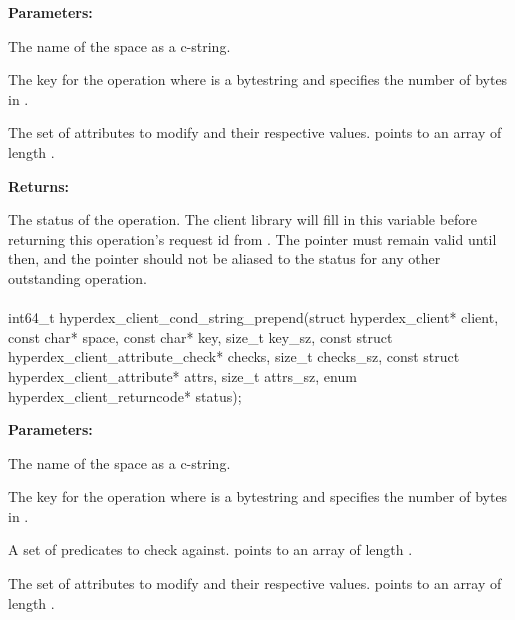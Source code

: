 \noindent\textbf{Parameters:}
\begin{description}[labelindent=\widthof{{\code{attrs}, \code{attrs\_sz}}},leftmargin=*,noitemsep,nolistsep,align=right]
\item[\code{space}] The name of the space as a c-string.
\item[\code{key}, \code{key\_sz}] The key for the operation where  is a bytestring and  specifies the number of bytes in .
\item[\code{attrs}, \code{attrs\_sz}] The set of attributes to modify and their respective values.   points to an array of length .
\end{description}

\noindent\textbf{Returns:}
\begin{description}[labelindent=\widthof{{\code{status}}},leftmargin=*,noitemsep,nolistsep,align=right]
\item[\code{status}] The status of the operation.  The client library will fill in this variable before returning this operation's request id from .  The pointer must remain valid until then, and the pointer should not be aliased to the status for any other outstanding operation.
\end{description}

\paragraph{}
\label{api:c:cond_string_prepend}
\begin{ccode}
int64_t hyperdex_client_cond_string_prepend(struct hyperdex_client* client,
        const char* space,
        const char* key, size_t key_sz,
        const struct hyperdex_client_attribute_check* checks, size_t checks_sz,
        const struct hyperdex_client_attribute* attrs, size_t attrs_sz,
        enum hyperdex_client_returncode* status);
\end{ccode}
\funcdesc 

\noindent\textbf{Parameters:}
\begin{description}[labelindent=\widthof{{\code{checks}, \code{checks\_sz}}},leftmargin=*,noitemsep,nolistsep,align=right]
\item[\code{space}] The name of the space as a c-string.
\item[\code{key}, \code{key\_sz}] The key for the operation where  is a bytestring and  specifies the number of bytes in .
\item[\code{checks}, \code{checks\_sz}] A set of predicates to check against.   points to an array of length .
\item[\code{attrs}, \code{attrs\_sz}] The set of attributes to modify and their respective values.   points to an array of length .
\end{description}

